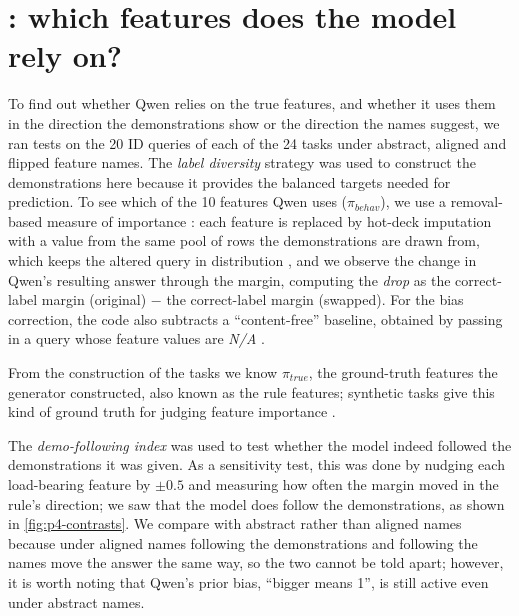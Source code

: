 \section{: which features does the model rely on?}
\label{sec:shift-rq3}
To find out whether Qwen relies on the true features, and whether it uses them in the direction the demonstrations show or the direction the names suggest, we ran tests on the 20 ID queries of each of the 24 tasks under abstract, aligned and flipped feature names. The \emph{label diversity} strategy was used to construct the demonstrations here because it provides the balanced targets needed for prediction. To see which of the 10 features Qwen uses ($\pi_{behav}$), we use a removal-based measure of importance \citep{breiman2001random,covert2021explaining}: each feature is replaced by hot-deck imputation \citep{andridge2010review} with a value from the same pool of rows the demonstrations are drawn from, which keeps the altered query in distribution \citep{zhu2026faithfulness}, and we observe the change in Qwen's resulting answer through the margin, computing the \emph{drop} as the correct-label margin (original) $-$ the correct-label margin (swapped). For the bias correction, the code also subtracts a ``content-free'' baseline, obtained by passing in a query whose feature values are \emph{N/A} \citep{zhao2021calibrate}.

From the construction of the tasks we know $\pi_{true}$, the ground-truth features the generator constructed, also known as the rule features; synthetic tasks give this kind of ground truth for judging feature importance \citep{liu2021synthetic}.


The \emph{demo-following index} was used to test whether the model indeed followed the demonstrations it was given. As a sensitivity test, this was done by nudging each load-bearing feature by $\pm 0.5$ and measuring how often the margin moved in the rule's direction; we saw that the model does follow the demonstrations, as shown in \autoref{fig:p4-contrasts}. We compare with abstract rather than aligned names because under aligned names following the demonstrations and following the names move the answer the same way, so the two cannot be told apart; however, it is worth noting that Qwen's prior bias, ``bigger means 1'', is still active even under abstract names.

